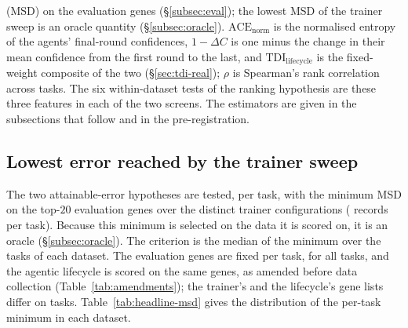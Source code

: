 \begin{table}[htp]
{(MSD) on the evaluation genes (\S\ref{subsec:eval}); the lowest MSD of the trainer sweep is an
oracle quantity (\S\ref{subsec:oracle}). $\mathrm{ACE}_{\mathrm{norm}}$ is the normalised
entropy of the agents' final-round confidences, $1-\Delta C$ is one minus the change in their
mean confidence from the first round to the last, and $\mathrm{TDI}_{\mathrm{lifecycle}}$ is
the fixed-weight composite of the two (\S\ref{sec:tdi-real}); $\rho$ is Spearman's rank
correlation across tasks. The six within-dataset tests of the ranking hypothesis are these
three features in each of the two screens. The estimators are given in the subsections that follow
and in the pre-registration.}
\label{tab:gates}
\end{table}

\subsection{Lowest error reached by the trainer sweep}\label{subsec:h12}

The two attainable-error hypotheses are tested, per task, with the minimum MSD on the top-$20$
evaluation genes over the \resNDistinctConfigs{} distinct trainer configurations
(\resNTrainerRecordsPerTask{} records per task). Because this minimum is selected on the data it
is scored on, it is an oracle (\S\ref{subsec:oracle}). The criterion is the median of the
minimum over the tasks of each dataset. The evaluation genes are fixed per task, for all
\resEvalGeneTasks{} tasks, and the agentic lifecycle is scored on the same genes, as amended
before data collection (Table~\ref{tab:amendments}); the trainer's and the lifecycle's gene
lists differ on \resEvalGeneMismatch{} tasks. Table~\ref{tab:headline-msd} gives the
distribution of the per-task minimum in each dataset.

